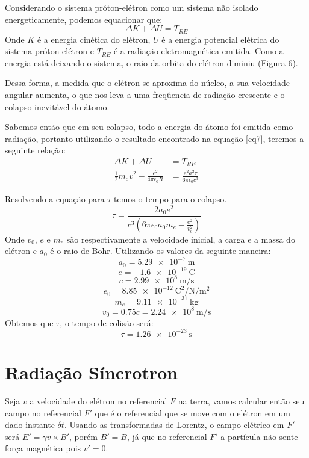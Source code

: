 \documentclass[12pt, letterpaper]{article}
\begin{document}
    Considerando o sistema próton-elétron como um sistema não isolado energeticamente, podemos equacionar que:
    \begin{equation} \label{eq10}
        \Delta K + \Delta U = T_{RE}
    \end{equation}
    Onde $K$ é a energia cinética do elétron, $U$ é a energia potencial elétrica do sistema próton-elétron e $T_{RE}$ é a radiação eletromagnética emitida. Como a energia está deixando o sistema, o raio da orbita do elétron diminiu (Figura 6).

    Dessa forma, a medida que o elétron se aproxima do núcleo, a sua velocidade angular aumenta, o que nos leva a uma freqûencia de radiação crescente e o colapso inevitável do átomo.

    Sabemos então que em seu colapso, todo a energia do átomo foi emitida como radiação, portanto utilizando o resultado encontrado na equação \ref{eq7}, teremos a seguinte relação:
    \begin{equation} \label{eq11}
    \begin{split}
        \Delta K + \Delta U &= T_{RE} \\
        \frac{1}{2}m_e v^2 - \frac{e^2}{4\pi\epsilon_0R} &= \frac{e^2a^2\tau}{6\pi\epsilon_0c^3}
    \end{split}
    \end{equation}

    Resolvendo a equação para $\tau$ temos o tempo para o colapso.
    \begin{equation} \label{eq12}
        \tau = \frac{2a_0e^2}{c^3(6\pi\epsilon_0a_0m_e - \frac{e^2}{v_0^2})}
    \end{equation}
    Onde $v_0$, $e$ e $m_e$ são respectivamente a velocidade inicial, a carga e a massa do elétron e $a_0$ é o raio de Bohr.
    Utilizando os valores da seguinte maneira:
    $$
    a_0 = \SI{5.29e-7}{\meter}
    $$$$
    e = \SI{-1.6e-19}{\coulomb}
    $$$$
    c = \SI{2.99e8}{\meter\per\second}
    $$$$
    e_0 = \SI{8.85e-12}{\coulomb\squared\per\newton\per\meter\squared}
    $$$$
    m_e = \SI{9.11e-31}{\kilogram}
    $$$$
    v_0 = 0.75c = \SI{2.24e8}{\meter\per\second}
    $$
    Obtemos que $\tau$, o tempo de colisão será:
    $$
    \tau = \SI{1.26e-23}{\second}
    $$

\newpage
\section{Radiação Síncrotron}

    Seja $v$ a velocidade do elétron no referencial $F$ na terra, vamos calcular então seu campo no referencial $F'$ que é o referencial que se move com o elétron em um dado instante $\delta t$. Usando as transformadas de Lorentz, o campo elétrico em $F'$ será $E' = \gamma v\times B'$, porém $B' = B$, já que no referencial $F'$ a partícula não sente força magnética pois $v' = 0$. 
\end{document}
